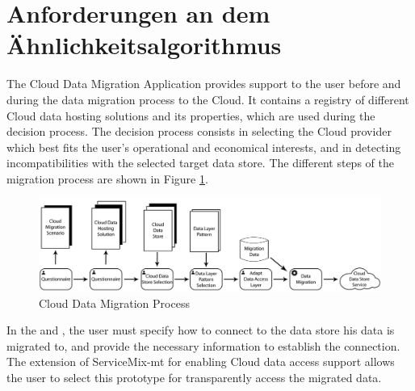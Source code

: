 \section{Anforderungen an dem Ähnlichkeitsalgorithmus}
\label{sec:AnforderungenÄhnlichkeitsalgorithmus}  

The Cloud Data Migration Application provides support to the user before and during the data migration process to the Cloud. It contains a registry of different Cloud data hosting solutions and its properties, which are used during the decision process. The decision process consists in selecting the Cloud provider which best fits the user's operational and economical interests, and in detecting incompatibilities with the selected target data store. The different steps of the migration process are shown in Figure \ref{fig:cloudmigrateapp}. 

\begin{figure}[htb]
	\centering
		\includegraphics[clip, scale=0.4]{./gfx/clouddatamigrationtool.png}
	\caption[Cloud Data Migration Application - Cloud Data Migration Process]{Cloud Data Migration Process \cite{bachmann2012}} 
	\label{fig:cloudmigrateapp}
\end{figure}

In the  and , the user must specify how to connect to the data store his data is migrated to, and provide the necessary information to establish the connection. The extension of ServiceMix-mt for enabling Cloud data access support allows the user to select this prototype for transparently access the migrated data. 

\FloatBarrier